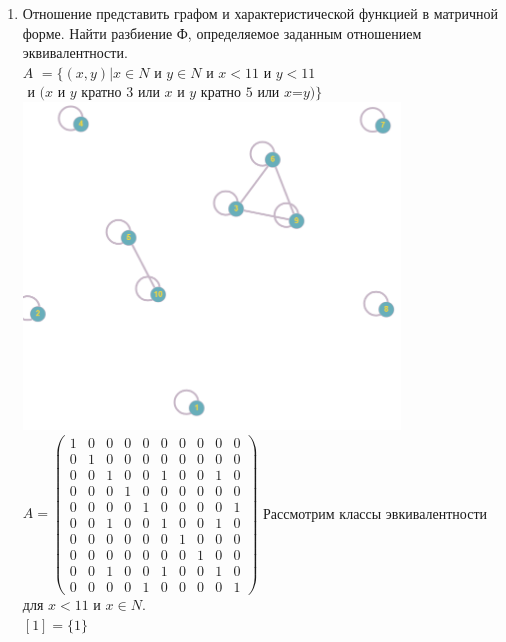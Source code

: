 \documentclass[a4paper,14pt]{extarticle}
\begin{document}
\begin{enumerate}[1.]
	\item Отношение представить графом и характеристической функцией в матричной форме.
	      Найти разбиение Ф, определяемое заданным отношением эквивалентности.\\
	      $\textit{A }=\{(x,y) | x\in N \textit{ и } y\in N \textit{ и } x<11 \textit{ и } y<11 $\\$\textit{ и (x и y кратно 3 или x и y кратно 5 или x=y)}\}$\\
		      \includegraphics[width=100mm]{task1}\\
	      $A = \begin{pmatrix}
		      1 & 0 & 0 & 0 & 0 & 0 & 0 & 0 & 0 & 0 \\
		      0 & 1 & 0 & 0 & 0 & 0 & 0 & 0 & 0 & 0 \\
		      0 & 0 & 1 & 0 & 0 & 1 & 0 & 0 & 1 & 0 \\
		      0 & 0 & 0 & 1 & 0 & 0 & 0 & 0 & 0 & 0 \\
		      0 & 0 & 0 & 0 & 1 & 0 & 0 & 0 & 0 & 1 \\
		      0 & 0 & 1 & 0 & 0 & 1 & 0 & 0 & 1 & 0 \\
		      0 & 0 & 0 & 0 & 0 & 0 & 1 & 0 & 0 & 0 \\
		      0 & 0 & 0 & 0 & 0 & 0 & 0 & 1 & 0 & 0 \\
		      0 & 0 & 1 & 0 & 0 & 1 & 0 & 0 & 1 & 0 \\
		      0 & 0 & 0 & 0 & 1 & 0 & 0 & 0 & 0 & 1
	      \end{pmatrix}$\bigbreak
		      Рассмотрим классы эвкивалентности для $x < 11$ и $x \in N$.\\
	      $[1] = \{1\}$\\

\end{enumerate}
\end{document}

